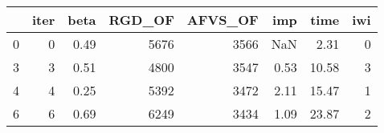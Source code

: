 \begin{tabular}{lrrrrrrr}
\toprule
{} &  iter &  beta &  RGD\_OF &  AFVS\_OF &  imp &  time &  iwi \\
\midrule
0 &     0 &  0.49 &    5676 &     3566 &  NaN &  2.31 &    0 \\
3 &     3 &  0.51 &    4800 &     3547 & 0.53 & 10.58 &    3 \\
4 &     4 &  0.25 &    5392 &     3472 & 2.11 & 15.47 &    1 \\
6 &     6 &  0.69 &    6249 &     3434 & 1.09 & 23.87 &    2 \\
\bottomrule
\end{tabular}
